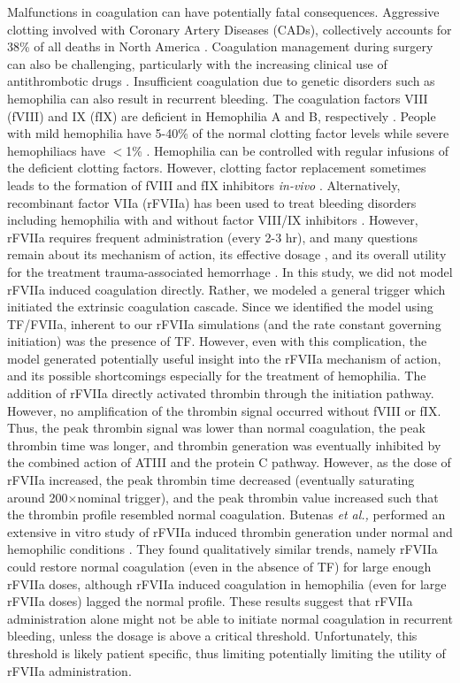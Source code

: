 \documentclass[12pt]{article}
\begin{document}
Malfunctions in coagulation can have potentially fatal consequences.
Aggressive clotting involved with Coronary Artery Diseases (CADs), collectively accounts for 38\% of all deaths in North America \cite{HANSSON2005}.
Coagulation management during surgery can also be challenging, particularly with the increasing clinical use of antithrombotic drugs \cite{Tanaka:2009wo}.   
Insufficient coagulation due to genetic disorders such as hemophilia can also result in recurrent bleeding. 
The coagulation factors VIII (fVIII) and IX (fIX) are deficient in Hemophilia A and B, respectively \cite{COOPER1994,MANNUCCI2001,MITCHELL2008}.
People with mild hemophilia have 5-40\% of the normal clotting factor levels while severe hemophiliacs have $<$1\% \cite{MITCHELL2008}.
Hemophilia can be controlled with regular infusions of the deficient clotting factors. 
However, clotting factor replacement sometimes leads to the formation of fVIII and fIX inhibitors \emph{in-vivo} \cite{TOMOKIYO2003}.
Alternatively, recombinant factor VIIa (rFVIIa) has been used to treat bleeding disorders \cite{Hedner:2008rm,Talbot:2009kk} including
hemophilia with and without factor VIII/IX inhibitors \cite{Shapiro:2008px}.
However, rFVIIa requires frequent administration (every 2-3 hr), and many questions remain about its mechanism of action, 
its effective dosage \cite{TOMOKIYO2003}, and its overall utility for the treatment trauma-associated hemorrhage \cite{Duchesne:2008hw}. 
In this study, we did not model rFVIIa induced coagulation directly. 
Rather, we modeled a general trigger which initiated the extrinsic coagulation cascade. 
Since we identified the model using TF/FVIIa, inherent to our rFVIIa simulations (and the rate constant governing initiation) 
was the presence of TF. However, even with this complication, 
the model generated potentially useful insight into the rFVIIa mechanism of action, and its possible shortcomings especially for the treatment of hemophilia. 
The addition of rFVIIa directly activated thrombin through the initiation pathway. 
However, no amplification of the thrombin signal occurred without fVIII or fIX. 
Thus, the peak thrombin signal was lower than normal coagulation, the peak thrombin time was longer, and thrombin generation was eventually inhibited by the combined action of ATIII and the protein C pathway.
However, as the dose of rFVIIa increased, the peak thrombin time decreased (eventually saturating around 200$\times$nominal trigger), and the peak thrombin value increased such that
the thrombin profile resembled normal coagulation.
Butenas \emph{et al.,} performed an extensive in vitro study of rFVIIa induced thrombin generation under normal and hemophilic conditions \citep{Butenas:2002ab}.
They found qualitatively similar trends, namely rFVIIa could restore normal coagulation (even in the absence of TF) for large enough rFVIIa doses, although rFVIIa induced coagulation 
in hemophilia (even for large rFVIIa doses) lagged the normal profile. 
These results suggest that rFVIIa administration alone
might not be able to initiate normal coagulation in recurrent bleeding, unless the dosage is above a critical threshold. 
Unfortunately, this threshold is likely patient specific, thus limiting potentially limiting the utility of rFVIIa administration.  
\end{document}
